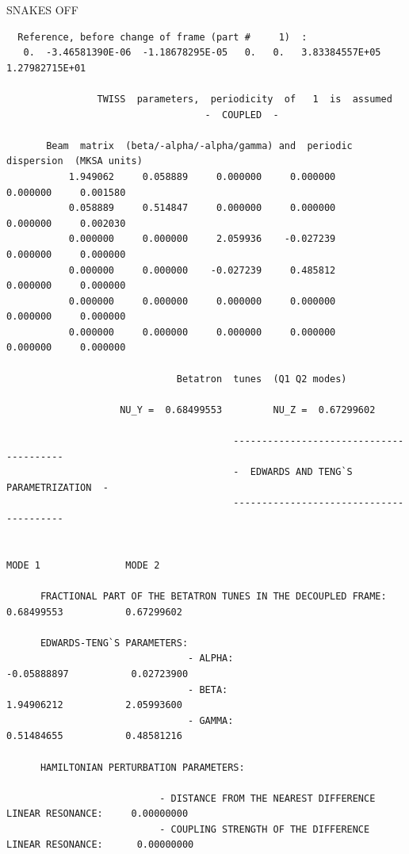 \documentclass[10pt]{article}
\begin{document}
\begin{minipage}{1.\linewidth}

\begin{minipage}{.49\linewidth}
SNAKES OFF
\tiny
\begin{verbatim}
  Reference, before change of frame (part #     1)  : 
   0.  -3.46581390E-06  -1.18678295E-05   0.   0.   3.83384557E+05   1.27982715E+01

                TWISS  parameters,  periodicity  of   1  is  assumed 
                                   -  COUPLED  -

       Beam  matrix  (beta/-alpha/-alpha/gamma) and  periodic  dispersion  (MKSA units)
           1.949062     0.058889     0.000000     0.000000     0.000000     0.001580
           0.058889     0.514847     0.000000     0.000000     0.000000     0.002030
           0.000000     0.000000     2.059936    -0.027239     0.000000     0.000000
           0.000000     0.000000    -0.027239     0.485812     0.000000     0.000000
           0.000000     0.000000     0.000000     0.000000     0.000000     0.000000
           0.000000     0.000000     0.000000     0.000000     0.000000     0.000000

                              Betatron  tunes  (Q1 Q2 modes)

                    NU_Y =  0.68499553         NU_Z =  0.67299602    

                                        ----------------------------------------
                                        -  EDWARDS AND TENG`S PARAMETRIZATION  -
                                        ----------------------------------------

                                                                              MODE 1               MODE 2

      FRACTIONAL PART OF THE BETATRON TUNES IN THE DECOUPLED FRAME:        0.68499553           0.67299602

      EDWARDS-TENG`S PARAMETERS:
                                - ALPHA:                                   -0.05888897           0.02723900
                                - BETA:                                     1.94906212           2.05993600
                                - GAMMA:                                    0.51484655           0.48581216

      HAMILTONIAN PERTURBATION PARAMETERS:

                           - DISTANCE FROM THE NEAREST DIFFERENCE LINEAR RESONANCE:     0.00000000
                           - COUPLING STRENGTH OF THE DIFFERENCE LINEAR RESONANCE:      0.00000000


\end{verbatim}
\end{minipage}
\end{minipage}
\end{document}
